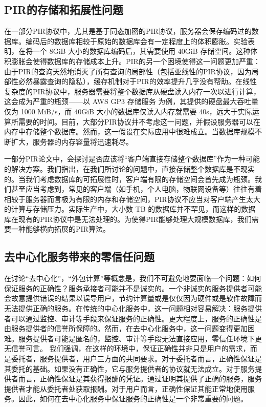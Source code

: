 \subsection{PIR的存储和拓展性问题}
在一部分PIR协议中，尤其是基于同态加密的PIR协议，服务器会保存编码过的数据库。编码后的数据库相较于原始的数据库会有一定程度上的体积膨胀。实验表明，在将一个 8GiB 大小的数据库编码后，其需要使用 40GiB 存储空间\cite{SimplePIR}。这种体积膨胀会使得数据库的存储成本上升。PIR的另一个困境使得这一问题更加严重：由于PIR的查询天然地消灭了所有查询的局部性（包括亚线性的PIR协议，因为局部性必然暴露查询的隐私），缓存机制对于PIR的效率提升几乎没有帮助。在线性复杂度的PIR协议中，服务器需要将整个数据库从硬盘读入内存一次以进行计算，这会成为严重的瓶颈——以 AWS GP3 存储服务 \cite{AWSEBSGP} 为例，其提供的硬盘最大吞吐量仅为 1000 MiB/s，而 40GiB 大小的数据库仅读入内存就需要 40s，远大于实际运算所需要的时间。目前，大部分PIR协议并不考虑这一问题，并假设服务器可以在内存中存储整个数据库。然而，这一假设在实际应用中很难成立。当数据库规模不断扩大，服务器的内存容量将迅速耗尽。

一部分PIR论文中，会探讨是否应该将“客户端直接存储整个数据库”作为一种可能的解决方案。我们指出，在我们所讨论的问题中，直接存储整个数据库是不现实的。当我们考虑数据库的可拓展性时，客户端有限的存储空间会首先成为瓶颈。我们甚至应当考虑到，常见的客户端（如手机，个人电脑，物联网设备等）往往有着相较于服务器而言极为有限的内存和存储空间，PIR协议不应当对客户端产生太大的计算与存储压力。实际生产中，大小数 TB 的数据库并不罕见，而这样的数据库在现有的PIR协议中是无法处理的。为使得PIR能够处理大规模数据库，我们需要一种能够横向拓展的PIR算法。

\subsection{去中心化服务带来的零信任问题}
在讨论“去中心化”，“外包计算”等概念是，我们不可避免地要面临一个问题：如何保证服务的正确性？服务承接者可能并不是诚实的。一个非诚实的服务提供者可能会故意提供错误的结果以误导用户，节约计算量或是仅仅因为硬件或是软件故障而无法提供正确的服务。在传统的中心化服务中，这一问题相对容易解决：服务提供者可以通过监控、审计等手段来保证服务的正确性。更大程度上，服务的正确性是由服务提供者的信誉所保障的。然而，在去中心化服务中，这一问题变得更加困难。服务提供者可能是匿名的，监控、审计等手段无法直接应用，零信任环境下更无信誉可言。
我们强调，在这样的环境中，保证正确性并非只是用户的需求，而是委托者，服务提供者，用户三方面的共同要求。对于委托者而言，正确性保证是其委托的基础。如果没有正确性，它与服务提供者的协议就无法成立。对于服务提供者而言，正确性保证是其获得报酬的凭证。通过证明其提供了正确的服务，服务提供者才能从委托者处获取报酬。对于用户而言，正确性保证其能正常地使用服务。因此，如何在去中心化服务中保证服务的正确性是一个非常重要的问题。

